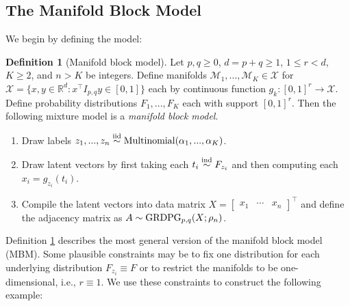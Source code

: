 \documentclass[
  11pt,
]{article}
\theoremstyle{definition}
\newtheorem{definition}{Definition}[section]
\theoremstyle{definition}
\theoremstyle{definition}
\theoremstyle{definition}
\theoremstyle{remark}
\begin{document}
\hypertarget{the-manifold-block-model}{%
\subsection{The Manifold Block Model}\label{the-manifold-block-model}}

We begin by defining the model:

\begin{definition}[Manifold block model]
\label{def:mbm}
Let $p, q \geq 0$, $d = p + q \geq 1$, $1 \leq r < d$, $K \geq 2$, and $n > K$ be integers. 
Define manifolds $\mathcal{M}_1, ..., \mathcal{M}_K \in \mathcal{X}$ for $\mathcal{X} = \{x, y \in \mathbb{R}^d : x^\top I_{p,q} y \in [0, 1]\}$ each by continuous function $g_k : [0, 1]^r \to \mathcal{X}$. 
Define probability distributions $F_1, ..., F_K$ each with support $[0, 1]^r$. 
Then the following mixture model is a {\em manifold block model}.

\begin{enumerate}
\item Draw labels $z_1, ..., z_n \stackrel{\mathrm{iid}}{\sim} \mathrm{Multinomial}(\alpha_1, ..., \alpha_K)$.
\item Draw latent vectors by first taking each $t_i \stackrel{\mathrm{ind}}{\sim} F_{z_i}$ and then computing each $x_i = g_{z_i}(t_i)$. 
\item Compile the latent vectors into data matrix $X = \begin{bmatrix} x_1 & \cdots & x_n \end{bmatrix}^\top$ and define the adjacency matrix as $A \sim \mathrm{GRDPG}_{p,q}(X; \rho_n)$. 
\end{enumerate}
\end{definition}

Definition \ref{def:mbm} describes the most general version of the manifold block model (MBM).
Some plausible constraints may be to fix one distribution for each underlying distribution \(F_{z_i} \equiv F\) or to restrict the manifolds to be one-dimensional, i.e., \(r \equiv 1\).
We use these constraints to construct the following example:
\end{document}
